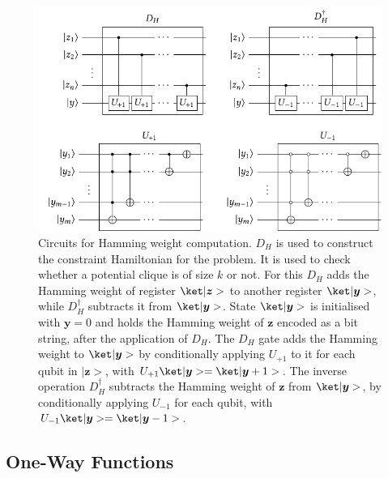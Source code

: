 \begin{figure}[htbp]
    \centering
    \includegraphics{figures/tikz/kclique_DH.pdf}
    \caption{Circuits for Hamming weight computation. $D_H$ is used to construct the constraint Hamiltonian for the \kclique problem. It is used to check whether a potential clique is of size $k$ or not. For this $D_H$ adds the Hamming weight of register $\ket|\bm{z}>$ to another register $\ket|\bm{y}>$, while $D_H^\dagger$ subtracts it from $\ket|\bm{y}>$. State $\ket|\bm{y}>$ is initialised with $\bm{y} = 0$ and holds the Hamming weight of $\bm{z}$ encoded as a bit string, after the application of $D_H$. The $D_H$ gate adds the Hamming weight to $\ket|\bm{y}>$ by conditionally applying $U_{+1}$ to it for each qubit in $|\bm{z}>$, with $U_{+1}\ket|\bm{y}> = \ket|\bm{y} + 1>$. The inverse operation $D_H^\dagger$ subtracts the Hamming weight of $\bm{z}$ from $\ket|\bm{y}>$, by conditionally applying $U_{-1}$ for each qubit, with $U_{-1}\ket|\bm{y}> = \ket|\bm{y} - 1>$.}
    \label{fig:kclique_DH}
\end{figure}


\subsection{One-Way Functions}
\label{sec:one_way_functions}

